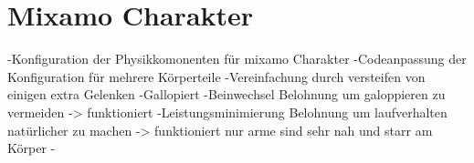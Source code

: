 \section{Mixamo Charakter}
-Konfiguration der Physikkomonenten für mixamo Charakter
-Codeanpassung der Konfiguration für mehrere Körperteile
-Vereinfachung durch versteifen von einigen extra Gelenken
-Gallopiert
-Beinwechsel Belohnung um galoppieren zu vermeiden -> funktioniert
-Leistungsminimierung Belohnung um laufverhalten natürlicher zu machen -> funktioniert nur arme sind sehr nah und starr am Körper
-